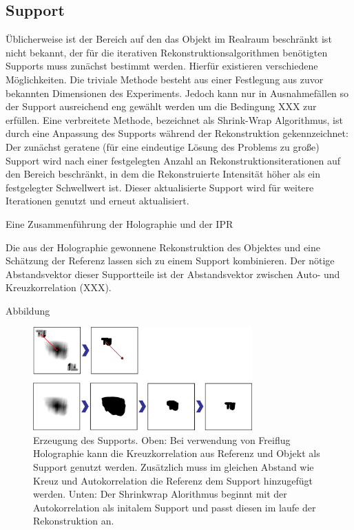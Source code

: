 \subsection{Support}
Üblicherweise ist der Bereich auf den das Objekt im Realraum beschränkt ist nicht bekannt, der für die iterativen Rekonstruktionsalgorithmen benötigten Supports muss zunächst bestimmt werden. Hierfür existieren verschiedene Möglichkeiten. Die triviale Methode besteht aus einer Festlegung aus zuvor bekannten Dimensionen des Experiments. Jedoch kann nur in Ausnahmefällen so der Support ausreichend eng gewählt werden um die Bedingung XXX zur erfüllen.
Eine verbreitete Methode, bezeichnet als Shrink-Wrap Algorithmus, ist durch eine Anpassung des Supports während der Rekonstruktion gekennzeichnet: Der zunächst geratene (für eine eindeutige Lösung des Problems  zu große) Support wird nach einer festgelegten Anzahl an Rekonstruktionsiterationen auf den Bereich beschränkt, in dem die Rekonstruierte Intensität höher als ein festgelegter Schwellwert ist. Dieser aktualisierte Support wird für weitere Iterationen genutzt und erneut aktualisiert\cite{marchesini2003}.

Eine Zusammenführung der Holographie und der IPR 

Die aus der Holographie gewonnene Rekonstruktion des Objektes und eine Schätzung der Referenz lassen sich zu einem Support kombinieren. Der nötige Abstandsvektor dieser Supportteile ist der  Abstandsvektor zwischen Auto- und Kreuzkorrelation (XXX).

Abbildung
	\begin{figure}
		\centering
		\includegraphics[width=0.75\textwidth]{images/support.eps}
		\caption[Abbildungstext im Abbildungsverzeichnis]{Erzeugung des Supports. Oben: Bei verwendung von Freiflug Holographie kann die Kreuzkorrelation aus Referenz und Objekt als Support genutzt werden. Zusätzlich muss im gleichen Abstand wie Kreuz und Autokorrelation die Referenz dem Support hinzugefügt werden. Unten: Der Shrinkwrap Alorithmus beginnt mit der Autokorrelation als initalem Support und passt diesen im laufe der Rekonstruktion an.}
		\label{Abb:BspAbbildung}
	\end{figure} 



